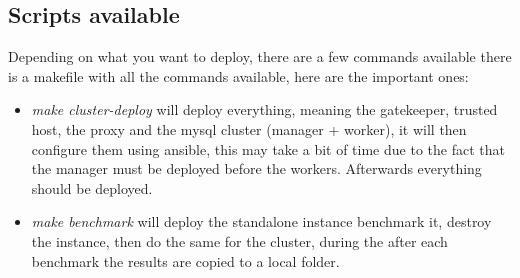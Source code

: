 \documentclass[11pt]{article}
\begin{document}
\subsection{Scripts available}
Depending on what you want to deploy, there are a few commands available there is a makefile with all the commands available, here are the important ones:
\begin{itemize}
	\item \textit{make cluster-deploy} will deploy everything, meaning the gatekeeper, trusted host, the proxy and the mysql cluster (manager + worker), it will then configure them using ansible, this may take a bit of time due to the fact that the manager must be deployed before the workers. Afterwards everything should be deployed.
	\item \textit{make benchmark} will deploy the standalone instance benchmark it, destroy the instance, then do the same for the cluster, during the after each benchmark the results are copied to a local folder.
\end{itemize}
\end{document}
